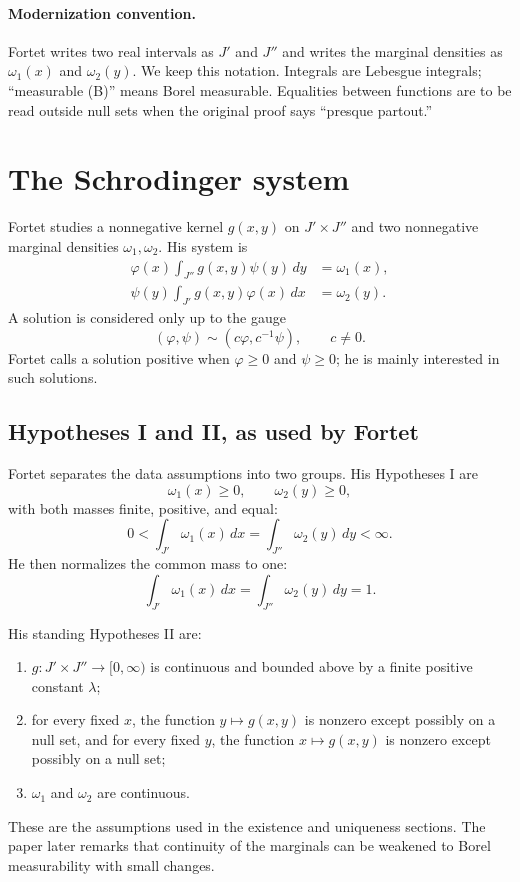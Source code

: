 \paragraph{Modernization convention.}
Fortet writes two real intervals as $J'$ and $J''$ and writes the marginal densities as $\omega_1(x)$ and $\omega_2(y)$.  We keep this notation.  Integrals are Lebesgue integrals; ``measurable (B)'' means Borel measurable.  Equalities between functions are to be read outside null sets when the original proof says ``presque partout.''

\section{The Schrodinger system}
Fortet studies a nonnegative kernel $g(x,y)$ on $J'\times J''$ and two nonnegative marginal densities $\omega_1,\omega_2$.  His system is
\begin{align}
  \varphi(x) \int_{J''} g(x,y)\psi(y)\,dy &= \omega_1(x), \tag{S1}\label{eq:fortet-S1}\\
  \psi(y) \int_{J'} g(x,y)\varphi(x)\,dx &= \omega_2(y). \tag{S2}\label{eq:fortet-S2}
\end{align}
A solution is considered only up to the gauge
\[
  (\varphi,\psi) \sim (c\varphi,c^{-1}\psi), \qquad c\ne 0.
\]
Fortet calls a solution positive when $\varphi\ge0$ and $\psi\ge0$; he is mainly interested in such solutions.

\subsection*{Hypotheses I and II, as used by Fortet}
Fortet separates the data assumptions into two groups.  His Hypotheses I are
\[
  \omega_1(x)\ge 0,\qquad \omega_2(y)\ge 0,
\]
with both masses finite, positive, and equal:
\[
  0<\int_{J'}\omega_1(x)\,dx
    =\int_{J''}\omega_2(y)\,dy<\infty.
\]
He then normalizes the common mass to one:
\begin{equation}
  \int_{J'}\omega_1(x)\,dx
  =\int_{J''}\omega_2(y)\,dy=1. \tag{3'}\label{eq:fortet-normalization}
\end{equation}

His standing Hypotheses II are:
\begin{enumerate}[leftmargin=2em]
\item $g:J'\times J''\to[0,\infty)$ is continuous and bounded above by a
finite positive constant $\lambda$;
\item for every fixed $x$, the function $y\mapsto g(x,y)$ is nonzero except
possibly on a null set, and for every fixed $y$, the function
$x\mapsto g(x,y)$ is nonzero except possibly on a null set;
\item $\omega_1$ and $\omega_2$ are continuous.
\end{enumerate}
These are the assumptions used in the existence and uniqueness sections.  The
paper later remarks that continuity of the marginals can be weakened to Borel
measurability with small changes.

